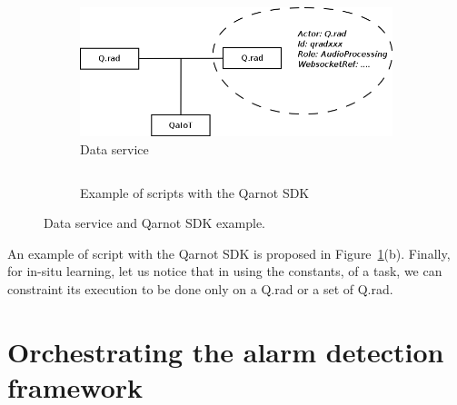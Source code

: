 \documentclass[10pt, conference, compsocconf]{IEEEtran}
\begin{document}
	\begin{figure}[ht]
          \begin{subfigure}[b]{0.4\textwidth}
            \centering
            \includegraphics[scale=0.3]{./Figures/DataService.png}
            \caption{Data service}
          \end{subfigure}
          \begin{subfigure}[b]{0.6\textwidth}
            \centering
            \inputminted[baselinestretch=1.2, bgcolor=LightGray, fontsize=\scriptsize]{python}{sample.py}
            \caption{Example of scripts with the Qarnot SDK}
          \end{subfigure}
          \caption{Data service and Qarnot SDK example.} 
          \label{fig:arch}
	\end{figure}

An example of script with the Qarnot SDK is proposed in Figure~\ref{fig:arch}(b). Finally, for in-situ learning, let us notice that 
in using the constants, of a task, we can constraint its execution to be done only on a Q.rad or a set of Q.rad.


\section{Orchestrating the alarm detection framework} \label{Orchestrator}
\end{document}
